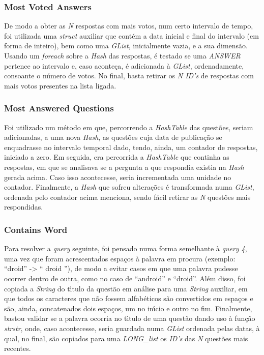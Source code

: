 \documentclass{article}
\begin{document}
\subsubsection{Most Voted Answers}
\par De modo a obter as \emph{N} respostas com mais votos, num certo intervalo de tempo, foi utilizada uma \emph{struct} auxiliar que cont\'{e}m a data inicial e final do intervalo (em forma de inteiro), bem como uma \emph{GList}, inicialmente vazia, e a sua dimens\~{a}o. Usando um \emph{foreach} sobre a \emph{Hash} das respostas, \'{e} testado se uma \emph{ANSWER} pertence ao intervalo e, caso aconte\c{c}a, \'{e} adicionada \`{a} \emph{GList}, ordenadamente, consoante o n\'{u}mero de votos. No final, basta retirar os \emph{N ID's} de respostas com mais votos presentes na lista ligada. 

\subsubsection{Most Answered Questions}
\par Foi utilizado um m\'{e}todo em que, percorrendo a \emph{HashTable} das quest\~{o}es, seriam adicionadas, a uma nova \emph{Hash}, as quest\~{o}es cuja data de publica\c{c}\~{a}o se enquadrasse no intervalo temporal dado, tendo, ainda, um contador de respostas, iniciado a zero. Em seguida, era percorrida a \emph{HashTable} que continha as respostas, em que se analisava se a pergunta a que respondia existia na \emph{Hash} gerada acima. Caso isso acontecesse, seria incrementada uma unidade no contador. Finalmente, a \emph{Hash} que sofreu altera\c{c}\~{o}es \'{e} transformada numa \emph{GList}, ordenada pelo contador acima menciona, sendo f\'{a}cil retirar as \emph{N} quest\~{o}es mais respondidas. 

\subsubsection{Contains Word}
\par Para resolver a \emph{query} seguinte, foi pensado numa forma semelhante \`{a} \emph{query 4}, uma vez que foram acrescentados espa\c{c}os \`{a} palavra em procura (exemplo: \textquotedblleft{}droid\textquotedblright{} -\textgreater{} \textquotedblleft{} droid \textquotedblright{}), de modo a evitar casos em que uma palavra pudesse ocorrer dentro de outra, como no caso de \textquotedblleft{}android\textquotedblright{} e \textquotedblleft{}droid\textquotedblright{}. Al\'{e}m disso, foi copiada a \emph{String} do t\'{\i}tulo da quest\~{a}o em an\'{a}lise para uma \emph{String} auxiliar, em que todos os caracteres que n\~{a}o fossem alfab\'{e}ticos s\~{a}o convertidos em espa\c{c}os e s\~{a}o, ainda, concatenados dois espa\c{c}os, um no in\'{\i}cio e outro no fim. Finalmente, bastou validar se a palavra ocorria no t\'{\i}tulo de uma quest\~{a}o dando uso \`{a} fun\c{c}\~{a}o \emph{strstr}, onde, caso acontecesse, seria guardada numa \emph{GList} ordenada pelas datas, \`{a} qual, no final, s\~{a}o copiados para uma \emph{LONG\_list} os \emph{ID's} das \emph{N} quest\~{o}es mais recentes.  
\end{document}
